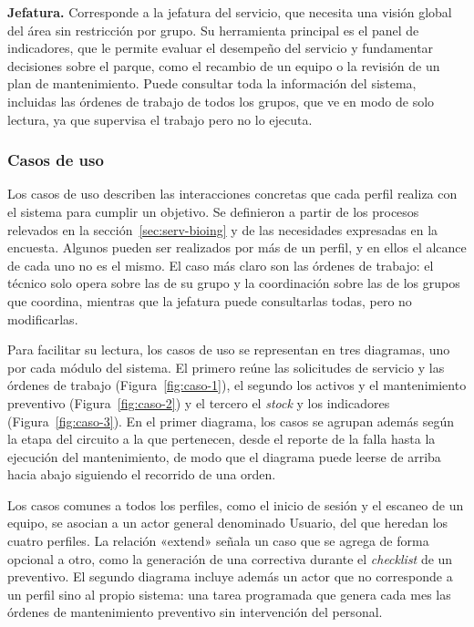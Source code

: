 \documentclass[10pt]{article}
\begin{document}
\textbf {Jefatura.} Corresponde a la jefatura del servicio, que necesita una visión global del área sin restricción por grupo. Su herramienta principal es el panel de indicadores, que le permite evaluar el desempeño del servicio y fundamentar decisiones sobre el parque, como el recambio de un equipo o la revisión de un plan de mantenimiento. Puede consultar toda la información del sistema, incluidas las órdenes de trabajo de todos los grupos, que ve en modo de solo lectura, ya que supervisa el trabajo pero no lo ejecuta.

\subsubsection{Casos de uso}
\label{sec:casos-uso}

Los casos de uso describen las interacciones concretas que cada perfil realiza con el sistema para cumplir un objetivo. Se definieron a partir de los procesos relevados en la sección~\ref{sec:serv-bioing} y de las necesidades expresadas en la encuesta. Algunos pueden ser realizados por más de un perfil, y en ellos el alcance de cada uno no es el mismo. El caso más claro son las órdenes de trabajo: el técnico solo opera sobre las de su grupo y la coordinación sobre las de los grupos que coordina, mientras que la jefatura puede consultarlas todas, pero no modificarlas. 

Para facilitar su lectura, los casos de uso se representan en tres diagramas, uno por cada módulo del sistema. El primero reúne las solicitudes de servicio y las órdenes de trabajo (Figura~\ref{fig:caso-1}), el segundo los activos y el mantenimiento preventivo (Figura~\ref{fig:caso-2}) y el tercero el \textit{stock} y los indicadores (Figura~\ref{fig:caso-3}). En el primer diagrama, los casos se agrupan además según la etapa del circuito a la que pertenecen, desde el reporte de la falla hasta la ejecución del mantenimiento, de modo que el diagrama puede leerse de arriba hacia abajo siguiendo el recorrido de una orden. 

Los casos comunes a todos los perfiles, como el inicio de sesión y el escaneo de un equipo, se asocian a un actor general denominado Usuario, del que heredan los cuatro perfiles. La relación «extend» señala un caso que se agrega de forma opcional a otro, como la generación de una correctiva durante el \textit{checklist} de un preventivo. El segundo diagrama incluye además un actor que no corresponde a un perfil sino al propio sistema: una tarea programada que genera cada mes las órdenes de mantenimiento preventivo sin intervención del personal.
\end{document}
